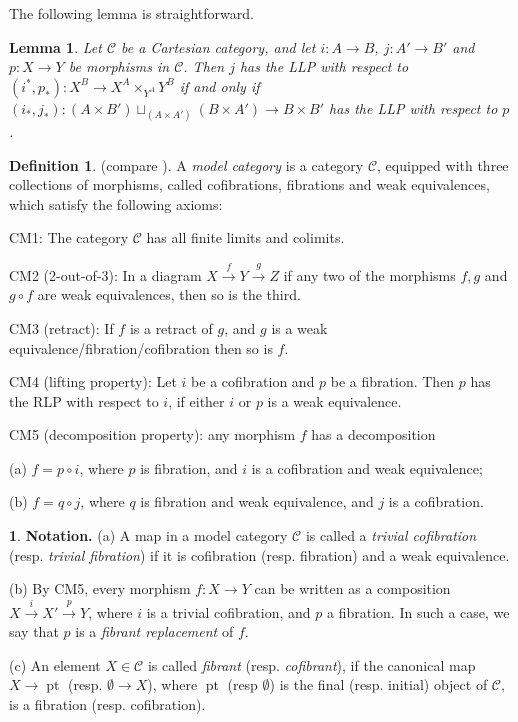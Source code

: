 \documentclass[12pt]{amsart}
\theoremstyle{plain}
\newtheorem{Lem}[Thm]{Lemma}
\theoremstyle{definition}
\newtheorem{Def}[Thm]{Definition}
\newtheorem{Emp}[Thm]{}
\numberwithin{equation}{section}
\newcommand{\cal}[1]{\mathcal{#1}}
\newcommand{\C}[1]{\cal#1}
\newcommand{\pt}{\operatorname{pt}}
\begin{document}
The following lemma is straightforward.

\begin{Lem} \label{L:RLP}
Let ${\C{C}}$ be a Cartesian category, and let $i:A\to B$,
$j:A'\to B'$ and $p:X\to Y$ be morphisms in ${\C{C}}$. Then $j$
has the LLP with respect to $(i^*,p_*):X^B\to X^A\times_{Y^A}Y^B$
if and only if $(i_*,j_*):(A\times B')\sqcup_{(A\times
A')}(B\times A')\to B\times B'$ has the LLP with respect to $p$.
\end{Lem}

\begin{Def} \label{D:model}
(compare \cite[II,1]{GJ}). A {\em model category} is a category
${\C{C}}$, equipped with three collections of morphisms, called
cofibrations, fibrations and weak equivalences, which satisfy the
following axioms:

CM1: The category ${\C{C}}$ has all finite limits and colimits.

CM2 (2-out-of-3): In a diagram
$X\overset{f}{\to}Y\overset{g}{\to}Z$ if any two of the morphisms
$f,g$ and $g\circ f$ are weak equivalences, then so is the third.

CM3 (retract): If $f$ is a retract of $g$, and $g$ is a weak
equivalence/fibration/cofibration then so is $f$.

CM4 (lifting property): Let $i$ be a cofibration and $p$ be a
fibration. Then $p$ has the RLP with respect to $i$, if either $i$
or $p$ is a weak equivalence.

CM5 (decomposition property): any morphism $f$ has a decomposition

(a) $f=p\circ i$, where $p$ is fibration, and $i$ is a cofibration
and weak equivalence;

(b) $f=q\circ j$, where $q$ is fibration and weak equivalence, and
$j$ is a cofibration.
\end{Def}

\begin{Emp} \label{E:trivfib}
{\bf Notation.} (a) A map in a model category ${\C{C}}$ is called
a {\em trivial cofibration} (resp. {\em trivial fibration}) if it
is cofibration (resp. fibration) and a weak equivalence.

(b) By CM5, every morphism $f:X\to Y$ can be written as a
composition $X\overset{i}{\to}X'\overset{p}{\to}Y$, where $i$ is a
trivial cofibration, and $p$ a fibration. In such a case, we 
say that $p$ is a {\em fibrant replacement} of $f$.

(c) An element $X\in {\C{C}}$ is called {\em fibrant} (resp. {\em
cofibrant}), if the canonical map $X\to\pt$ (resp. $\emptyset\to
X$), where $\pt$ (resp $\emptyset$) is the final (resp. initial)
object of ${\C{C}}$, is a fibration (resp. cofibration).


\end{Emp}
\end{document}
